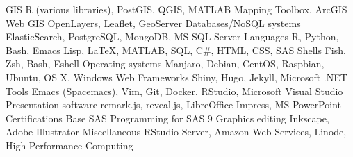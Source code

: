 \begin{cvtechskills}
    \cvtechskill    
        {GIS}
        {R (various libraries), PostGIS, QGIS, MATLAB Mapping Toolbox, ArcGIS}
        {}
        {}
    \cvtechskill    
        {Web GIS}
        {OpenLayers, Leaflet, GeoServer}
        {}
        {}
    \cvtechskill    
        {Databases/NoSQL systems}
        {ElasticSearch, PostgreSQL, MongoDB, MS SQL Server}
        {}
        {}
    \cvtechskill    
        {Languages}
        {R, Python, Bash, Emacs Lisp, LaTeX, MATLAB, SQL, C\#, HTML, CSS, SAS}
        {}
        {}
    \cvtechskill    
        {Shells}
        {Fish, Zsh, Bash, Eshell}
        {}
        {}
    \cvtechskill    
        {Operating systems}
        {Manjaro, Debian, CentOS, Raspbian, Ubuntu, OS X, Windows}
        {}
        {}  
    \cvtechskill    
        {Web Frameworks}
        {Shiny, Hugo, Jekyll, Microsoft .NET}
        {}
        {}  
    \cvtechskill
        {Tools}
        {Emacs (Spacemacs), Vim, Git, Docker, RStudio, Microsoft Visual Studio}
        {}
        {}
    \cvtechskill    
        {Presentation software}
        {remark.js, reveal.js, LibreOffice Impress, MS PowerPoint}
        {}
        {}
    \cvtechskill
        {Certifications}
        {Base SAS Programming for SAS 9}
        {}
        {}
    \cvtechskill
        {Graphics editing}
        {Inkscape, Adobe Illustrator}
        {}
        {}
    \cvtechskill
        {Miscellaneous}
        {RStudio Server, Amazon Web Services, Linode, High Performance Computing}
        {}
        {}
\end{cvtechskills}